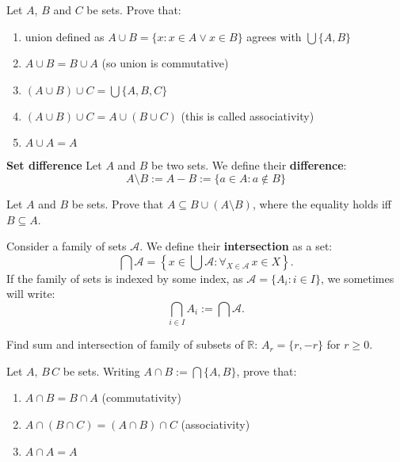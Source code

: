 \begin{exercise}
  Let $A$, $B$ and $C$ be sets. Prove that:
  \begin{enumerate}
    \item union defined as $A\cup B=\{x : x\in A \vee x\in B\}$ agrees with $\bigcup \{A, B\}$
    \item $A\cup B = B\cup A$ (so union is commutative)
    \item $(A\cup B)\cup C = \bigcup \{A,B,C\}$
    \item $(A\cup B)\cup C = A\cup (B\cup C)$ (this is called associativity)
    \item $A\cup A=A$
  \end{enumerate}
\end{exercise}

\begin{definition}
  \textbf{Set difference} Let $A$ and $B$ be two sets. We define their \textbf{difference}:
  $$A\setminus B := A-B := \{a \in A : a\notin B\}$$
\end{definition}

\begin{exercise}
  Let $A$ and $B$ be sets. Prove that $A\subseteq B\cup (A\setminus B)$, where the equality holds iff $B\subseteq A$.
\end{exercise}

\begin{definition}
  Consider a family of sets $\mathcal A$. We define their \textbf{intersection} as a set:
  $$\bigcap \mathcal A = \left\{x\in \bigcup \mathcal A : \forall_{X\in\mathcal A}\, x\in X\right\}.$$
  If the family of sets is indexed by some index, as $\mathcal A = \{A_i : i\in I\}$, we sometimes will write:
  $$\bigcap_{i\in I} A_i := \bigcap \mathcal A.$$
\end{definition}

\begin{exercise}
	Find sum and intersection of family of subsets of $\mathbb R$: $A_r=\{r, -r\}$ for $r\ge 0.$
\end{exercise}

\begin{exercise}
	Let $A,\,B\,C$ be sets. Writing $A\cap B := \bigcap \{A,B\}$, prove that:
	\begin{enumerate}
		\item $A\cap B=B\cap A$ (commutativity)
		\item $A\cap (B\cap C)=(A\cap B)\cap C$ (associativity)
    \item $A\cap A=A$
	\end{enumerate}
\end{exercise}

